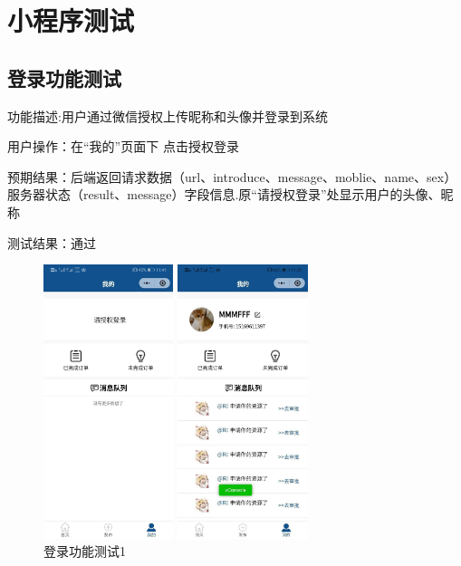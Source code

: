 \chapter{小程序测试}

\section{登录功能测试}

功能描述:用户通过微信授权上传昵称和头像并登录到系统

用户操作：在“我的”页面下 点击授权登录

预期结果：后端返回请求数据（url、introduce、message、moblie、name、sex）服务器状态（result、message）字段信息.原“请授权登录”处显示用户的头像、昵称

测试结果：通过
\begin{figure}[htbp]
    \centering
    \begin{minipage}[t]{0.32\textwidth}
    \centering
    \includegraphics[width=3.8cm,height=8cm]{test/image/test1.png} 
    \caption{登录功能测试1}
    \end{minipage}
    \begin{minipage}[t]{0.32\textwidth}
    \centering
    \includegraphics[width=3.8cm,height=8cm]{test/image/test2.png}

\end{minipage}
\end{figure}
